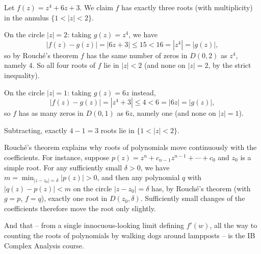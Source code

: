 \documentclass[a4paper]{scrartcl}
\begin{document}
\begin{example}
    Let $f(z) = z^4 + 6z + 3$. We claim $f$ has exactly three roots (with multiplicity) in the annulus $\{1 < |z| < 2\}$.

    On the circle $|z| = 2$: taking $g(z) = z^4$, we have
    $$
    |f(z) - g(z)| = |6z + 3| \leq 15 < 16 = |z^4| = |g(z)|,
    $$
    so by Rouch\'e's theorem $f$ has the same number of zeros in $D(0, 2)$ as $z^4$, namely $4$. So all four roots of $f$ lie in $|z| < 2$ (and none on $|z| = 2$, by the strict inequality).

    On the circle $|z| = 1$: taking $g(z) = 6z$ instead,
    $$
    |f(z) - g(z)| = |z^4 + 3| \leq 4 < 6 = |6z| = |g(z)|,
    $$
    so $f$ has as many zeros in $D(0, 1)$ as $6z$, namely one (and none on $|z| = 1$).

    Subtracting, exactly $4 - 1 = 3$ roots lie in $\{1 < |z| < 2\}$.
\end{example}

\begin{example}
    Rouch\'e's theorem explains why roots of polynomials move continuously with the coefficients. For instance, suppose $p(z) = z^n + c_{n-1}z^{n-1} + \cdots + c_0$ and $z_0$ is a simple root. For any sufficiently small $\delta > 0$, we have $m = \min_{|z - z_0| = \delta}|p(z)| > 0$, and then any polynomial $q$ with $|q(z) - p(z)| < m$ on the circle $|z - z_0| = \delta$ has, by Rouch\'e's theorem (with $g = p$, $f = q$), exactly one root in $D(z_0, \delta)$. Sufficiently small changes of the coefficients therefore move the root only slightly.
\end{example}

And that -- from a single innocuous-looking limit defining $f'(w)$, all the way to counting the roots of polynomials by walking dogs around lampposts -- is the IB Complex Analysis course.
\end{document}

